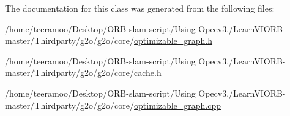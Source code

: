 The documentation for this class was generated from the following files\+:\begin{DoxyCompactItemize}
\item 
/home/teeramoo/\+Desktop/\+O\+R\+B-\/slam-\/script/\+Using Opecv3./\+Learn\+V\+I\+O\+R\+B-\/master/\+Thirdparty/g2o/g2o/core/\hyperlink{optimizable__graph_8h}{optimizable\+\_\+graph.\+h}\item 
/home/teeramoo/\+Desktop/\+O\+R\+B-\/slam-\/script/\+Using Opecv3./\+Learn\+V\+I\+O\+R\+B-\/master/\+Thirdparty/g2o/g2o/core/\hyperlink{cache_8h}{cache.\+h}\item 
/home/teeramoo/\+Desktop/\+O\+R\+B-\/slam-\/script/\+Using Opecv3./\+Learn\+V\+I\+O\+R\+B-\/master/\+Thirdparty/g2o/g2o/core/\hyperlink{optimizable__graph_8cpp}{optimizable\+\_\+graph.\+cpp}\end{DoxyCompactItemize}
